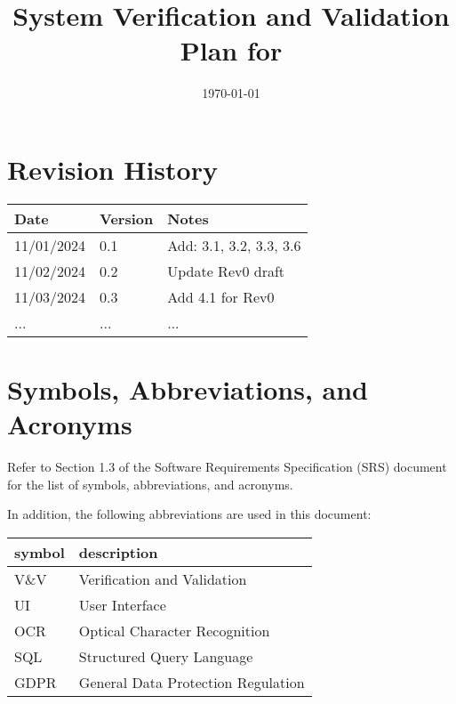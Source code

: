 \documentclass[12pt, titlepage]{article}
\begin{document}
\title{System Verification and Validation Plan for \progname{}} 
\author{\authname}
\date{\today}
	
\maketitle


\section*{Revision History}

\begin{tabularx}{\textwidth}{p{3cm}p{2cm}X}
\toprule {\bf Date} & {\bf Version} & {\bf Notes}\\
\midrule
11/01/2024 & 0.1 & Add: 3.1, 3.2, 3.3, 3.6\\
11/02/2024 & 0.2 & Update Rev0 draft\\
11/03/2024 & 0.3 & Add 4.1 for Rev0\\
... & ... & ...\\
\bottomrule
\end{tabularx}

\newpage

\tableofcontents

\newpage

\section{Symbols, Abbreviations, and Acronyms}

Refer to Section 1.3 of the Software Requirements Specification (SRS) document
for the list of symbols, abbreviations, and acronyms.

In addition, the following abbreviations are used in this document:\\

\renewcommand{\arraystretch}{1.2}
\begin{tabular}{l l} 
  \toprule		
  \textbf{symbol} & \textbf{description}\\
  \midrule 
  V\&V & Verification and Validation\\
  UI & User Interface\\
  OCR & Optical Character Recognition\\
  SQL & Structured Query Language\\
  GDPR & General Data Protection Regulation\\
  \bottomrule
\end{tabular}\\
\end{document}
